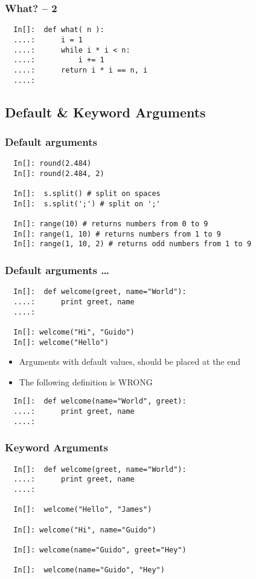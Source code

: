 \begin{frame}[fragile]
  \frametitle{What? -- 2}
  \begin{lstlisting}
  In[]:  def what( n ):
  ....:      i = 1
  ....:      while i * i < n:
  ....:          i += 1
  ....:      return i * i == n, i
  ....:
  \end{lstlisting}
\end{frame}

\subsection*{Default \& Keyword Arguments}

\begin{frame}[fragile]
  \frametitle{Default arguments}
  \begin{lstlisting}
  In[]: round(2.484)
  In[]: round(2.484, 2)

  In[]:  s.split() # split on spaces
  In[]:  s.split(';') # split on ';'

  In[]: range(10) # returns numbers from 0 to 9
  In[]: range(1, 10) # returns numbers from 1 to 9
  In[]: range(1, 10, 2) # returns odd numbers from 1 to 9
  \end{lstlisting}
\end{frame}

\begin{frame}[fragile]
  \frametitle{Default arguments \ldots}
  \begin{lstlisting}
  In[]:  def welcome(greet, name="World"):
  ....:      print greet, name
  ....:

  In[]: welcome("Hi", "Guido")
  In[]: welcome("Hello")
  \end{lstlisting}
  \begin{itemize}
  \item Arguments with default values, should be placed at the end
  \item The following definition is \alert{WRONG}
  \end{itemize}
  \begin{lstlisting}
  In[]:  def welcome(name="World", greet):
  ....:      print greet, name
  ....:
  \end{lstlisting}
\end{frame}

\begin{frame}[fragile]
  \frametitle{Keyword Arguments}
  \begin{lstlisting}
  In[]:  def welcome(greet, name="World"):
  ....:      print greet, name
  ....:

  In[]:  welcome("Hello", "James")

  In[]: welcome("Hi", name="Guido")

  In[]: welcome(name="Guido", greet="Hey")

  In[]:  welcome(name="Guido", "Hey")
  \end{lstlisting}
\end{frame}

